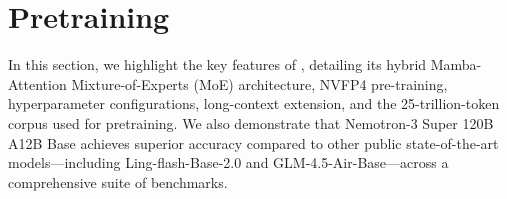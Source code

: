 \section{Pretraining}
\label{sec:pretraining}



In this section, we highlight the key features of \ourbasemodel, detailing its hybrid Mamba-Attention Mixture-of-Experts (MoE) architecture, NVFP4 pre-training, hyperparameter configurations, long-context extension, and the 25-trillion-token corpus used for pretraining. We also demonstrate that Nemotron-3 Super 120B A12B Base achieves superior accuracy compared to other public state-of-the-art models—including Ling-flash-Base-2.0 and GLM-4.5-Air-Base—across a comprehensive suite of benchmarks. %







